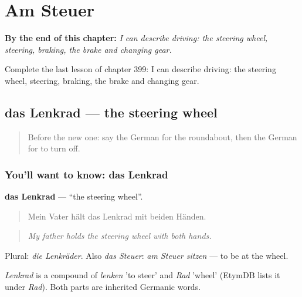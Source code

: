 
\chapter{Am Steuer}
\label{ch:ge-am-steuer}

\begin{chapteropening}
\textbf{By the end of this chapter:} \emph{I can describe driving: the steering wheel, steering, braking, the brake and changing gear.}

Complete the last lesson of chapter 399: I can describe driving: the steering wheel, steering, braking, the brake and changing gear.
\end{chapteropening}

\section[das Lenkrad]{das Lenkrad — the steering wheel}

\label{lesson:GE-C399-lenkrad}



\begin{quote}
Before the new one: say the German for the roundabout, then the German for to turn off.
\end{quote}

\subsection*{You'll want to know: das Lenkrad}
\textbf{das Lenkrad} — \textquotedblleft{}the steering wheel\textquotedblright{}.

\begin{quote}
Mein Vater hält das Lenkrad mit beiden Händen.
\end{quote}

\begin{quote}
\emph{My father holds the steering wheel with both hands.}
\end{quote}

Plural: \emph{die Lenkräder}. Also \emph{das Steuer}: \emph{am Steuer sitzen} — to be at the wheel.

\begin{cousinweb}
\emph{Lenkrad} is a compound of \emph{lenken} 'to steer' and \emph{Rad} 'wheel' (EtymDB lists it under \emph{Rad}). Both parts are inherited Germanic words.
\end{cousinweb}

